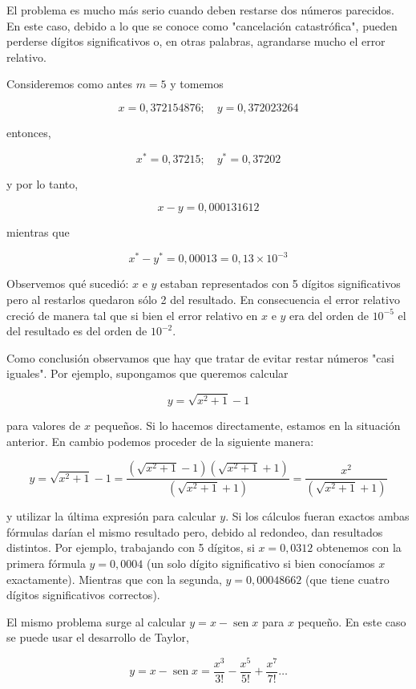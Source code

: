 \documentclass[10pt]{article}
\begin{document}
El problema es mucho más serio cuando deben restarse dos números parecidos. En este caso, debido a lo que se conoce como "cancelación catastrófica", pueden perderse dígitos significativos o, en otras palabras, agrandarse mucho el error relativo.

Consideremos como antes $m=5$ y tomemos

$$
x=0,372154876 ; \quad y=0,372023264
$$

entonces,

$$
x^{*}=0,37215 ; \quad y^{*}=0,37202
$$

y por lo tanto,

$$
x-y=0,000131612
$$

mientras que

$$
x^{*}-y^{*}=0,00013=0,13 \times 10^{-3}
$$

Observemos qué sucedió: $x$ e $y$ estaban representados con 5 dígitos significativos pero al restarlos quedaron sólo 2 del resultado. En consecuencia el error relativo creció de manera tal que si bien el error relativo en $x$ e $y$ era del orden de $10^{-5}$ el del resultado es del orden de $10^{-2}$.

Como conclusión observamos que hay que tratar de evitar restar números "casi iguales". Por ejemplo, supongamos que queremos calcular

$$
y=\sqrt{x^{2}+1}-1
$$

para valores de $x$ pequeños. Si lo hacemos directamente, estamos en la situación anterior. En cambio podemos proceder de la siguiente manera:

$$
y=\sqrt{x^{2}+1}-1=\frac{\left(\sqrt{x^{2}+1}-1\right)\left(\sqrt{x^{2}+1}+1\right)}{\left(\sqrt{x^{2}+1}+1\right)}=\frac{x^{2}}{\left(\sqrt{x^{2}+1}+1\right)}
$$

y utilizar la última expresión para calcular $y$. Si los cálculos fueran exactos ambas fórmulas darían el mismo resultado pero, debido al redondeo, dan resultados distintos. Por ejemplo, trabajando con 5 dígitos, si $x=0,0312$ obtenemos con la primera fórmula $y=0,0004$ (un solo dígito significativo si bien conocíamos $x$ exactamente). Mientras que con la segunda, $y=0,00048662$ (que tiene cuatro dígitos significativos correctos).

El mismo problema surge al calcular $y=x-\operatorname{sen} x$ para $x$ pequeño. En este caso se puede usar el desarrollo de Taylor,

$$
y=x-\operatorname{sen} x=\frac{x^{3}}{3!}-\frac{x^{5}}{5!}+\frac{x^{7}}{7!} \ldots
$$
\end{document}
